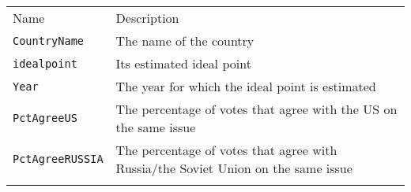 \documentclass[]{article}
\begin{document}
\begin{longtable}[c]{@{}ll@{}}
\toprule\addlinespace
\begin{minipage}[b]{0.25\columnwidth}\raggedright
Name
\end{minipage} & \begin{minipage}[b]{0.68\columnwidth}\raggedright
Description
\end{minipage}
\\\addlinespace
\midrule\endhead
\begin{minipage}[t]{0.25\columnwidth}\raggedright
\texttt{CountryName}
\end{minipage} & \begin{minipage}[t]{0.68\columnwidth}\raggedright
The name of the country
\end{minipage}
\\\addlinespace
\begin{minipage}[t]{0.25\columnwidth}\raggedright
\texttt{idealpoint}
\end{minipage} & \begin{minipage}[t]{0.68\columnwidth}\raggedright
Its estimated ideal point
\end{minipage}
\\\addlinespace
\begin{minipage}[t]{0.25\columnwidth}\raggedright
\texttt{Year}
\end{minipage} & \begin{minipage}[t]{0.68\columnwidth}\raggedright
The year for which the ideal point is estimated
\end{minipage}
\\\addlinespace
\begin{minipage}[t]{0.25\columnwidth}\raggedright
\texttt{PctAgreeUS}
\end{minipage} & \begin{minipage}[t]{0.68\columnwidth}\raggedright
The percentage of votes that agree with the US on the same issue
\end{minipage}
\\\addlinespace
\begin{minipage}[t]{0.25\columnwidth}\raggedright
\texttt{PctAgreeRUSSIA}
\end{minipage} & \begin{minipage}[t]{0.68\columnwidth}\raggedright
The percentage of votes that agree with Russia/the Soviet Union on the
same issue
\end{minipage}
\\\addlinespace
\bottomrule
\end{longtable}
\end{document}
